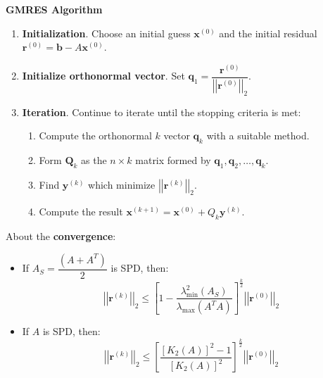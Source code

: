 \begin{flushleft}
    \textcolor{Green3}{ \textbf{GMRES Algorithm}}
\end{flushleft}
\begin{enumerate}
    \item \textbf{Initialization}. Choose an initial guess $\mathbf{x}^{\left(0\right)}$ and the initial residual $\mathbf{r}^{\left(0\right)} = \mathbf{b} - A\mathbf{x}^{\left(0\right)}$.

    \item \textbf{Initialize orthonormal vector}. Set $\mathbf{q}_{1} = \dfrac{\mathbf{r}^{\left(0\right)}}{{\left|\left|\mathbf{r}^{\left(0\right)}\right|\right|}_{2}}$.

    \item \textbf{Iteration}. Continue to iterate until the stopping criteria is met:
    \begin{enumerate}
        \item Compute the orthonormal $k$ vector $\mathbf{q}_{k}$ with a suitable method.
        \item Form $\mathbf{Q}_{k}$ as the $n \times k$ matrix formed by $\mathbf{q}_{1}, \mathbf{q}_{2}, \dots, \mathbf{q}_{k}$.
        \item Find $\mathbf{y}^{\left(k\right)}$ which minimize ${\left|\left|\mathbf{r}^{\left(k\right)}\right|\right|}_{2}$.
        \item Compute the result $\mathbf{x}^{\left(k+1\right)} = \mathbf{x}^{\left(0\right)} + Q_{k}\mathbf{y}^{\left(k\right)}$.
    \end{enumerate}
\end{enumerate}
About the \textbf{convergence}:
\begin{itemize}
    \item If $A_{S} = \dfrac{\left(A + A^{T}\right)}{2}$ is SPD, then:
    \begin{equation}
        {\left|\left|\mathbf{r}^{\left(k\right)}\right|\right|}_{2} \le \left[1 - \dfrac{
            \lambda^{2}_{\min}\left(A_{S}\right)
        }{
            \lambda_{\max}\left(A^{T}A\right)
        }\right]^{\frac{k}{2}}
        {\left|\left|\mathbf{r}^{\left(0\right)}\right|\right|}_{2}
    \end{equation}

    \item If $A$ is SPD, then:
    \begin{equation}
        {\left|\left|\mathbf{r}^{\left(k\right)}\right|\right|}_{2} \le \left[\dfrac{
            \left[K_{2}\left(A\right)\right]^{2} - 1
        }{
            \left[K_{2}\left(A\right)\right]^{2}
        }\right]^{\frac{k}{2}}
        {\left|\left|\mathbf{r}^{\left(0\right)}\right|\right|}_{2}
    \end{equation}
\end{itemize}

